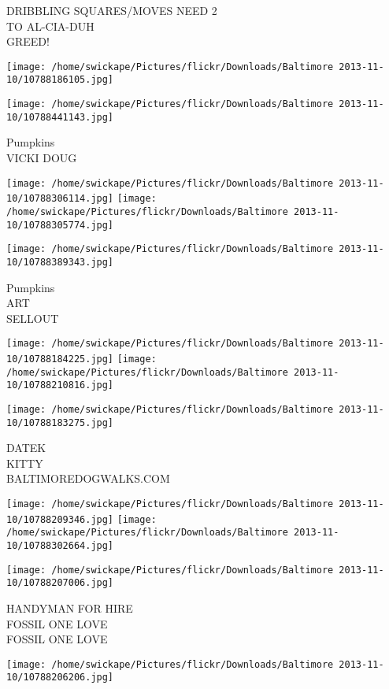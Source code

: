 \documentclass[10pt,letterpaper]{article}
\begin{document}
DRIBBLING SQUARES/MOVES NEED 2\\
TO AL{-}CIA{-}DUH\\
GREED!
\pagebreak

\texttt{[image: /home/swickape/Pictures/flickr/Downloads/Baltimore 2013-11-10/10788186105.jpg]}

\vspace{0.25in}
\texttt{[image: /home/swickape/Pictures/flickr/Downloads/Baltimore 2013-11-10/10788441143.jpg]}

Pumpkins\\
VICKI DOUG
\pagebreak

\texttt{[image: /home/swickape/Pictures/flickr/Downloads/Baltimore 2013-11-10/10788306114.jpg]}
\texttt{[image: /home/swickape/Pictures/flickr/Downloads/Baltimore 2013-11-10/10788305774.jpg]}

\vspace{0.25in}
\texttt{[image: /home/swickape/Pictures/flickr/Downloads/Baltimore 2013-11-10/10788389343.jpg]}

Pumpkins\\
ART\\
SELLOUT
\pagebreak

\texttt{[image: /home/swickape/Pictures/flickr/Downloads/Baltimore 2013-11-10/10788184225.jpg]}
\texttt{[image: /home/swickape/Pictures/flickr/Downloads/Baltimore 2013-11-10/10788210816.jpg]}

\vspace{0.25in}
\texttt{[image: /home/swickape/Pictures/flickr/Downloads/Baltimore 2013-11-10/10788183275.jpg]}

DATEK\\
KITTY\\
BALTIMOREDOGWALKS.COM
\pagebreak

\texttt{[image: /home/swickape/Pictures/flickr/Downloads/Baltimore 2013-11-10/10788209346.jpg]}
\texttt{[image: /home/swickape/Pictures/flickr/Downloads/Baltimore 2013-11-10/10788302664.jpg]}

\texttt{[image: /home/swickape/Pictures/flickr/Downloads/Baltimore 2013-11-10/10788207006.jpg]}

HANDYMAN FOR HIRE\\
FOSSIL ONE LOVE\\
FOSSIL ONE LOVE
\pagebreak

\texttt{[image: /home/swickape/Pictures/flickr/Downloads/Baltimore 2013-11-10/10788206206.jpg]}
\end{document}
